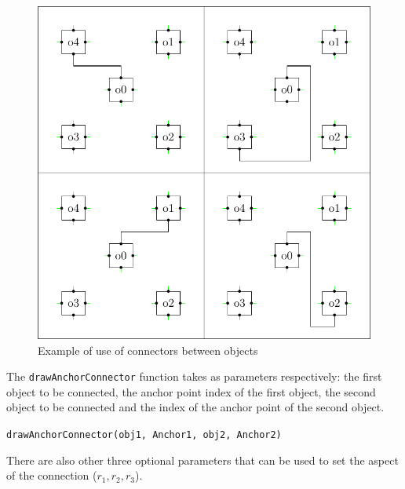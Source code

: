 \documentclass[a4paper,12pt]{report}
\begin{document}
\begin{figure}[ht]
  \centering
  \includegraphics[width=1.0\textwidth]{N-S}
  \caption{Example of use of connectors between objects}
  \label{connectorExample}
\end{figure}

The \texttt{drawAnchorConnector} function takes as parameters respectively: the first object to be connected,
the anchor point index of the first object, the second object to be connected and the index of the anchor point
of the second object.

\texttt{drawAnchorConnector(obj1, Anchor1, obj2, Anchor2)}

There are also other three optional parameters that can be used to set the aspect of the connection ($r_1,r_2,r_3$).
\end{document}
